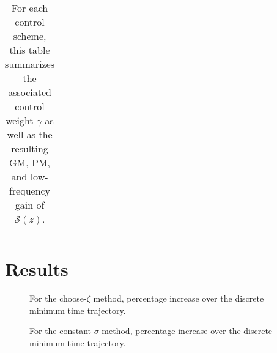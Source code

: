 \documentclass[journal,twocolumn,twoside]{IEEEtran}
\begin{document}
\begin{table}
  \caption{For each control scheme, this table summarizes the associated control weight $\gamma$ as well as the resulting GM, PM, and low-frequency gain of $\mathcal{S}(z)$.}
  \label{tab:gmpms}
  \begin{tabular}{ccccc}
    
  \end{tabular}
\end{table}

\section{Results}
\label{sec:org7edf36d}

\begin{figure*}
  \begin{minipage}{0.48\textwidth}
    
    \caption{For the choose-$\zeta$ method, percentage increase over the discrete minimum time trajectory.}
  \end{minipage}
  \hfill
  \begin{minipage}{0.48\textwidth}
    
    \caption{For the constant-$\sigma$ method, percentage increase over the discrete minimum time trajectory.}
  \end{minipage}
\end{figure*}
\end{document}

